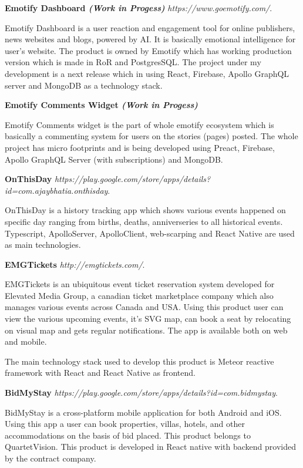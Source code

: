 \documentclass[margin,line]{res}
\begin{document}
\begin{resume}
\textbf{Emotify Dashboard \em (Work in Progess)} {\em https://www.goemotify.com/}. 

Emotify Dashboard is a user reaction and engagement tool for online publishers, news websites and blogs, powered by AI. It is basically emotional intelligence for user's website. The product is owned by Emotify which has working production version which is made in RoR and PostgresSQL. The project under my development is a next release which in using React, Firebase, Apollo GraphQL server and MongoDB as a technology stack.

\textbf{Emotify Comments Widget \em (Work in Progess)}

Emotify Comments widget is the part of whole emotify ecosystem which is basically a commenting system for users on the stories (pages) posted. The whole project has micro footprints and is being developed using Preact, Firebase, Apollo GraphQL Server (with subscriptions) and MongoDB.

\textbf{OnThisDay} {\em https://play.google.com/store/apps/details?id=com.ajaybhatia.onthisday}. 

OnThisDay is a history tracking app which shows various events happened on specific day ranging from births, deaths, anniverseries to all historical events. Typescript, ApolloServer, ApolloClient, web-scarping and React Native are used as main technologies.  
 
\textbf{EMGTickets} {\em http://emgtickets.com/}. 

EMGTickets is an ubiquitous event ticket reservation system developed for Elevated Media Group, a canadian ticket marketplace company which also manages various events across Canada and USA. Using this product user can view the various upcoming events, it's SVG map, can book a seat by relocating on visual map and gets regular notifications. The app is available both on web and mobile. 

The main technology stack used to develop this product is Meteor reactive framework with React and React Native as frontend.

\textbf{BidMyStay} {\em https://play.google.com/store/apps/details?id=com.bidmystay}. 

BidMyStay is a cross-platform mobile application for both Android and iOS. Using this app a user can book properties, villas, hotels, and other accommodations on the basis of bid placed. This product belongs to QuartetVision. This product is developed in React native with backend provided by the contract company.


\end{resume}
\end{document}
